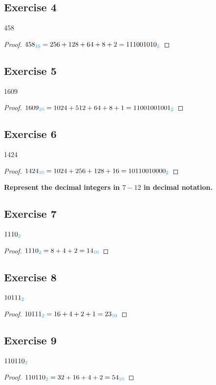 \documentclass[14pt]{extarticle}
\newcommand{\base}[1]{{\color{cyan}#1}}
\begin{document}
\subsection{Exercise 4} 
458

\begin{proof} 
$458_\base{10} = 256 + 128 + 64 + 8 + 2 = 111001010_\base{2}$
\end{proof}

\subsection{Exercise 5} 
1609

\begin{proof} 
$1609_\base{10} = 1024 + 512 + 64 + 8 + 1 = 11001001001_\base{2}$
\end{proof}

\subsection{Exercise 6} 
1424

\begin{proof} 
$1424_\base{10} = 1024 + 256 + 128 + 16 = 10110010000_\base{2}$
\end{proof}

{\bf \color{cyan} Represent the decimal integers in $7-12$ in decimal notation.}

\subsection{Exercise 7} 
$1110_\base{2}$

\begin{proof} 
$1110_\base{2} = 8 + 4 + 2 = 14_\base{10}$ 
\end{proof}

\subsection{Exercise 8} 
$10111_\base{2}$

\begin{proof} 
$10111_\base{2} = 16 + 4 + 2 + 1 = 23_\base{10}$ 
\end{proof}

\subsection{Exercise 9} 
$110110_\base{2}$

\begin{proof} 
$110110_\base{2} = 32 + 16 + 4 + 2 = 54_\base{10}$ 
\end{proof}
\end{document}
